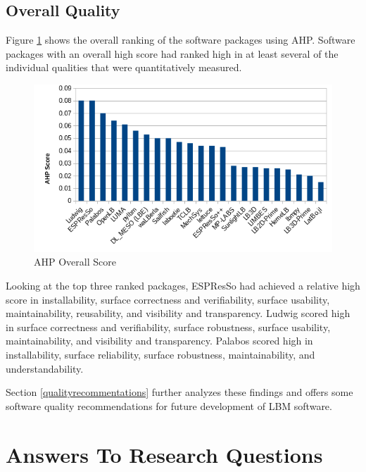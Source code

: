 \documentclass[12pt, notitlepage]{article}
\begin{document}
\subsection{Overall Quality}

Figure \ref{Fig_OverallScore} shows the overall ranking of the software packages using AHP. Software packages with an overall high score had ranked high in at least several of the individual qualities that were quantitatively measured.

\begin{figure}[h!]
	\begin{center}
		\includegraphics[width=1.0\textwidth]{finalscore_chart}
		\caption{AHP Overall Score}
		\label{Fig_OverallScore}
	\end{center}
\end{figure}

Looking at the top three ranked packages, ESPResSo had achieved a relative high score in installability, surface correctness and verifiability, surface usability, maintainability, reusability, and visibility and transparency. Ludwig scored high in surface correctness and verifiability, surface robustness, surface usability, maintainability, and visibility and transparency. Palabos scored high in installability, surface reliability, surface robustness, maintainability, and understandability. 

Section \ref{qualityrecommentations} further analyzes these findings and offers some software quality recommendations for future development of LBM software.

\newpage

\section{Answers To Research Questions}\label{answersquestions}
\end{document}
